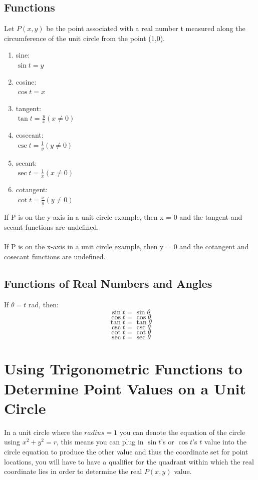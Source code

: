 \documentclass{article}
\begin{document}
\subsection{Functions}
Let $P(x,y)$ be the point associated with a real number t measured along the
circumference of the unit circle from the point (1,0).
\begin{enumerate}
  \item sine:\\
    $\sin t = y$

  \item cosine:\\
    $\cos t = x$ 
  
  \item tangent:\\
    $\tan t = \frac{y}{x} (x\ne0)$

  \item cosecant:\\
    $\csc t = \frac{1}{y} (y\ne0)$

  \item secant:\\
    $\sec t = \frac{1}{x} (x\ne0)$

  \item cotangent:\\
    $\cot t = \frac{x}{y} (y\ne0)$
\end{enumerate}
If P is on the y-axis in a unit circle example, then x = 0 and the
tangent and secant functions are undefined.\\\\
If P is on the x-axis in a unit circle example, then y = 0 and the
cotangent and cosecant functions are undefined. 

\subsection{Functions of Real Numbers and Angles}
If $\theta=t$ rad, then:
\[\sin t = \sin \theta\]
\[\cos t = \cos \theta\]
\[\tan t = \tan \theta\]
\[\csc t = \csc \theta\]
\[\cot t = \cot \theta\]
\[\sec t = \sec \theta\]


\section{Using Trigonometric Functions to Determine Point Values on a Unit
Circle}
In a unit circle where the $radius=1$ you can denote the equation of the
circle using $x^2+y^2=r$, this means you can plug in $\sin t$'s or $\cos t$'s
$t$ value into the circle equation to produce the other value and thus
the coordinate set for point locations, you will have to have a qualifier for
the quadrant within which the real coordinate lies in order to
determine the real $P(x,y)$ value. 
\end{document}
